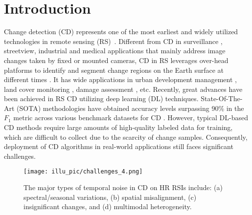 
\section{Introduction}\label{sc1}

Change detection (CD) represents one of the most earliest and widely utilized technologies in remote sensing (RS)~\cite{bruzzone2009domain, wu2023fully}. Different from CD in surveillance \cite{lanza2011statistical}, streetview\cite{taneja2015geometric}, industrial \cite{roth2022towards} and medical \cite{li2020siamese} applications that mainly address image changes taken by fixed or mounted cameras, CD in RS leverages over-head platforms to identify and segment change regions on the Earth surface at different times \cite{bruzzone2012novel}. It has wide applications in urban development management \cite{benedek2011building}, land cover monitoring \cite{robin2010contrario}, damage assessment \cite{brunner2010earthquake}, etc. Recently, great advances have been achieved in RS CD utilizing deep learning (DL) techniques. State-Of-The-Art (SOTA) methodologies have obtained accuracy levels surpassing 90\% in the $F_1$ metric across various benchmark datasets for CD \cite{chen2021remote, ding2024samcd}. However, typical DL-based CD methods require large amounts of high-quality labeled data for training, which are difficult to collect due to the scarcity of change samples. Consequently, deployment of CD algorithms in real-world applications still faces significant challenges.

\begin{figure}[!t]
\centering
    \texttt{[image: illu\_pic/challenges\_4.png]}
    \caption{The major types of temporal noise in CD on HR RSIs include: (a) spectral/seasonal variations, (b) spatial misalignment, (c) insignificant changes, and (d) multimodal heterogeneity.}
\label{fig.challenge}
\end{figure}

